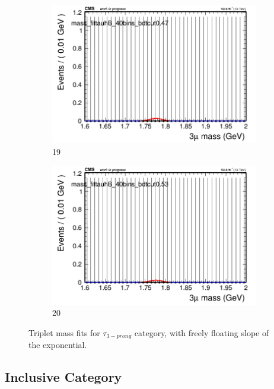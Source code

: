 \begin{figure}[h!]
\begin{subfigure}{0.2\textwidth}
        \includegraphics[width=\textwidth]{unfixed_exp/plots/tauhB/massfit_tauhB_40bins_bdtcut0.47.png}
        \caption{19}
    \end{subfigure}
    \begin{subfigure}{0.2\textwidth}
        \includegraphics[width=\textwidth]{unfixed_exp/plots/tauhB/massfit_tauhB_40bins_bdtcut0.53.png}
        \caption{20}
    \end{subfigure}
    \caption{Triplet mass fits for $\tau_{3-prong}$ category, with freely floating slope of the exponential.}
    \label{fig:unfixed_tauhb}
\end{figure}


\newpage

\subsection{Inclusive Category}
\label{sec:all_cat}

